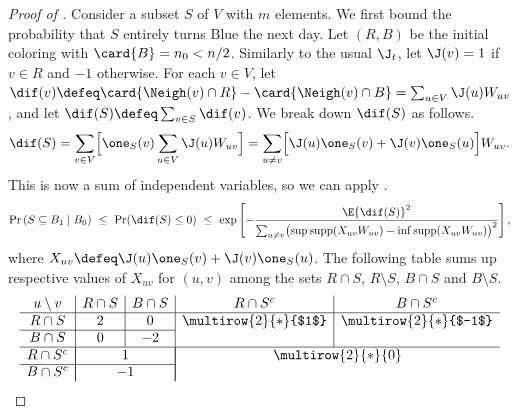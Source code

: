 \documentclass{toc}
\begin{document}
			\begin{proof}[Proof of ]
				Consider a subset $S$ of $V$ with $m$ elements.
				We first bound the probability that $S$ entirely turns Blue the next day.
				Let $(R, B)$ be the initial coloring with $\card{B} = n_0 < n/2$.
				Similarly to the usual $\J_t$, let $\J(v) = 1$ if $v\in R$ and $-1$ otherwise.
				For each $v\in V$, let
				$\dif(v) \defeq \card{\Neigh(v) \cap R} - \card{\Neigh(v) \cap B} = \sum_{u\in V} \J(u)W_{uv}$,
				and let $\dif(S) \defeq \sum_{v\in S}\dif(v)$.
				We break down $\dif(S)$ as follows.
				\begin{equation} \label{eq:difS}
					\begin{aligned}
						\dif(S) = \sum_{v\in V} \Bigl[\one_S(v)\sum_{u\in V}\J(u)W_{uv}\Bigr]
						= \sum_{u \neq v} \Bigl[\J(u)\one_S(v) + \J(v)\one_S(u) \Bigr] W_{uv}.
					\end{aligned}
				\end{equation}
				This is now a sum of independent variables, so we can apply .
				\begin{equation}  \label{eq:uni-bad-set-bound-temp1}
					\begin{aligned}
						\Pr\left(S\subseteq B_1\mid B_0\right)
						\ \le \ \Pr(\dif(S)\le 0)
						\ \le \ \exp\left[
						- \frac{\E{\dif(S)}^2}
						{\sum_{u\neq v} \bigl(\sup \text{supp}(X_{uv}W_{uv})
							- \inf \text{supp}(X_{uv}W_{uv})\bigr)^2}
						\right],
					\end{aligned}
				\end{equation}
				where $X_{uv} \defeq \J(u)\one_S(v) + \J(v)\one_S(u)$.
				The following table sums up respective values of $X_{uv}$ for $(u, v)$ among the sets
				$R\cap S$, $R\setminus S$, $B\cap S$ and $B\setminus S$.
				\begin{equation}  \label{eq:X_(uv)-table}
					\begin{array}{c|c|c|c|c}
						u\setminus v & R\cap S               & B\cap S               & R\cap S^c & B\cap S^c \\ \hline
						R\cap S      & 2 & 0 & \multirow{2}{*}{$1$} & \multirow{2}{*}{$-1$} \\ \cline{1-3}
						B\cap S      & 0 & -2 &           &  \\ \hline
						R\cap S^c    & \multicolumn{2}{|c|}{1}               & \multicolumn{2}{|c}{\multirow{2}{*}{0}}  \\ \cline{1-3}
						B\cap S^c    & \multicolumn{2}{|c|}{-1}              & \multicolumn{2}{|c}{}
					\end{array}
				\end{equation}
				

\end{proof}
\end{document}
